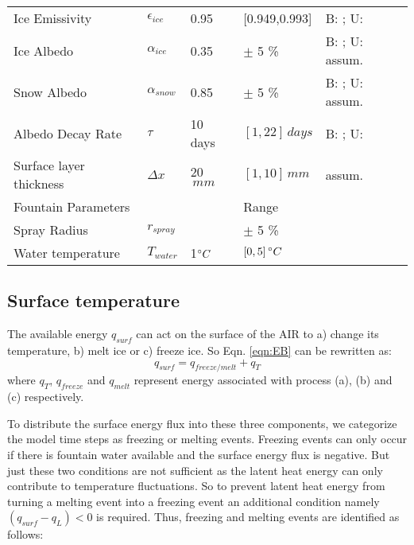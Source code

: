 \documentclass[utf8]{frontiersSCNS} %
\begin{document}
\begin{table}
\begin{tabularx}{\linewidth}{ X l X l X  }
        Ice Emissivity        & $\epsilon_{ice}$ & 0.95 & [0.949,0.993] & B: \citeauthor{CuffeyPaterson_2010}; U:
        \citeauthor{HORI2006486}\\
        Ice Albedo         & $\alpha_{ice}$ & 0.35 & $\pm$ 5 \%  & B: \citeauthor{CuffeyPaterson_2010}; U: assum.   \\
        
        Snow Albedo        & $\alpha_{snow}$ & 0.85 & $\pm$ 5 \% & B: \citeauthor{CuffeyPaterson_2010}; U: assum.  \\
        Albedo Decay Rate & $\tau$ & 10 days & $[1,22]\, days$ & B: \citeauthor{Schmidt_2017}; U:
        \citeauthor{OerlemansKnap_1998}  \\ Surface layer thickness & $\Delta x$ & 20 $\,mm$ & $[1,10]\, mm$   & assum.\\
        \hline Fountain Parameters& & & Range   & \\ \hline 
        Spray Radius & $r_{spray}$ &  & $\pm$ 5 \%   & \\
        Water temperature & $T_{water}$ & 1$\degree C$ & $[0,5]\, \degree C$   & \\
        \hline \end{tabularx} \label{table:parameters} \end{table} 

\subsection{Surface temperature}
The available energy $q_{surf}$ can act on the surface of the AIR to a) change its temperature, b) melt ice or
c) freeze ice. So Eqn. \ref{eqn:EB} can be rewritten as: \begin{equation} q_{surf} = q_{freeze/melt} +
q_{T} \end{equation}
where $q_{T}$, $q_{freeze}$ and $q_{melt}$ represent energy associated with process (a), (b) and (c) respectively.

To distribute the surface energy flux into these three components, we categorize the model time steps as freezing or
melting events. Freezing events can only occur if there is fountain water available and the surface energy flux is
negative. But just these two conditions are not sufficient as the latent heat energy can only contribute to temperature
fluctuations. So to prevent latent heat energy from turning a melting event into a freezing event an additional
condition namely $(q_{surf}-q_{L}) < 0$ is required. Thus, freezing and melting events are identified as follows:
\end{document}
